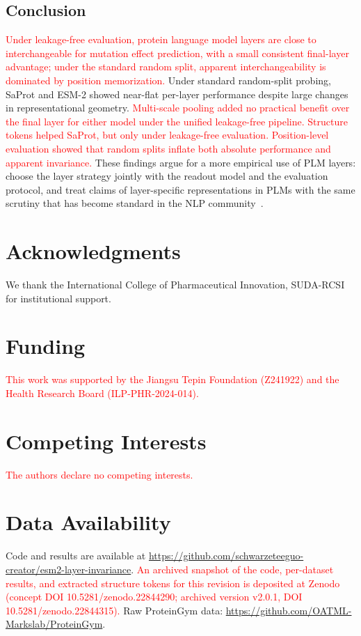 \documentclass[numbered,webpdf,modern,large]{oup-authoring-template}
\newcommand{\rev}[1]{\textcolor{red}{#1}}
\begin{document}
\subsection{Conclusion}

\rev{Under leakage-free evaluation, protein language model layers are close to
interchangeable for mutation effect prediction, with a small consistent final-layer
advantage; under the standard random split, apparent interchangeability is dominated
by position memorization.} Under standard random-split probing,
SaProt and ESM-2 showed near-flat per-layer performance despite large changes in
representational geometry. \rev{Multi-scale pooling added no practical benefit
over the final layer for either model under the unified leakage-free pipeline.
Structure tokens helped SaProt, but only under leakage-free evaluation.
Position-level evaluation showed that random splits inflate both absolute
performance and apparent invariance.} These findings argue for a more empirical use
of PLM layers: choose the layer strategy jointly with the readout model and the
evaluation protocol, and treat claims of layer-specific representations in PLMs with
the same scrutiny that has become standard in the NLP community~\cite{rogers2021bertology}.

\section*{Acknowledgments}
We thank the International
College of Pharmaceutical Innovation, SUDA-RCSI for institutional support.

\section*{Funding}
\rev{This work was supported by the Jiangsu Tepin Foundation (Z241922) and
the Health Research Board (ILP-PHR-2024-014).}

\section*{Competing Interests}
\rev{The authors declare no competing interests.}

\section*{Data Availability}
Code and results are available at \url{https://github.com/schwarzeteeguo-creator/esm2-layer-invariance}.
\rev{An archived snapshot of the code, per-dataset results, and extracted
structure tokens for this revision is deposited at Zenodo (concept DOI
10.5281/zenodo.22844290; archived version v2.0.1, DOI 10.5281/zenodo.22844315).}
Raw ProteinGym data: \url{https://github.com/OATML-Markslab/ProteinGym}.
\end{document}
